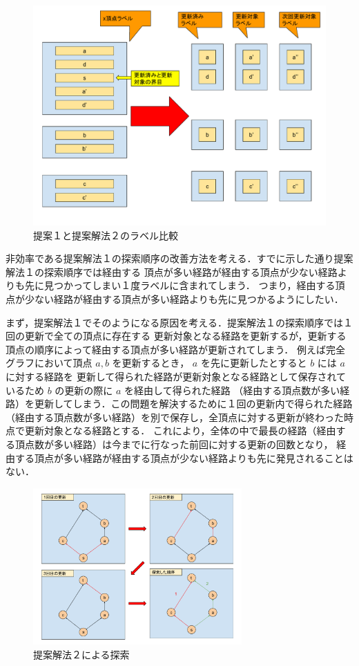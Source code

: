 \documentclass[12pt]{optlab-bachelor}
\begin{document}
\begin{figure}[htbp]
  \centering
  \caption{提案１と提案解法２のラベル比較}
  \includegraphics[width=12.0cm]{fig/fig8.pdf}
\end{figure}

非効率である提案解法１の探索順序の改善方法を考える．すでに示した通り提案解法１の探索順序では経由する
頂点が多い経路が経由する頂点が少ない経路よりも先に見つかってしまい１度ラベルに含まれてしまう．
つまり，経由する頂点が少ない経路が経由する頂点が多い経路よりも先に見つかるようにしたい．

まず，提案解法１でそのようになる原因を考える．提案解法１の探索順序では１回の更新で全ての頂点に存在する
更新対象となる経路を更新するが，更新する頂点の順序によって経由する頂点が多い経路が更新されてしまう．
例えば完全グラフにおいて頂点 $a,b$ を更新するとき， $a$ を先に更新したとすると $b$ には $a$ に対する経路を
更新して得られた経路が更新対象となる経路として保存されているため $b$ の更新の際に $a$ を経由して得られた経路
（経由する頂点数が多い経路）を更新してしまう．この問題を解決するために１回の更新内で得られた経路
（経由する頂点数が多い経路）を別で保存し，全頂点に対する更新が終わった時点で更新対象となる経路とする．
これにより，全体の中で最長の経路（経由する頂点数が多い経路）は今までに行なった前回に対する更新の回数となり，
経由する頂点が多い経路が経由する頂点が少ない経路よりも先に発見されることはない．

\begin{figure}[htbp]
  \centering
  \caption{提案解法２による探索}
  \includegraphics[height=6.0cm, width=8.0cm]{fig/fig7.pdf}
\end{figure}
\end{document}
